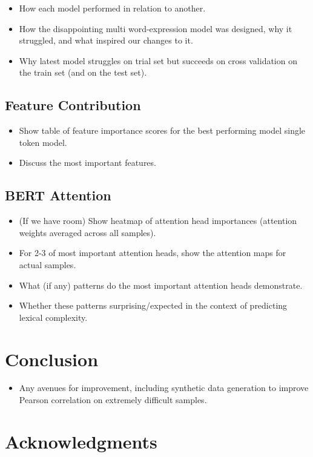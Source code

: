 \documentclass[11pt,a4paper]{article}
\begin{document}
\begin{itemize}
  \item How each model performed in relation to another.
  \item How the disappointing multi word-expression model was designed, why it struggled, and what inspired our changes to it.
  \item Why latest model struggles on trial set but succeeds on cross validation on the train set (and on the test set).
\end{itemize}

\subsection{Feature Contribution}

\begin{itemize}
  \item Show table of feature importance scores for the best performing model single token model.
  \item Discuss the most important features.
\end{itemize}

\subsection{BERT Attention}

\begin{itemize}
  \item (If we have room) Show heatmap of attention head importances (attention weights averaged across all samples).
  \item For 2-3 of most important attention heads, show the attention maps for actual samples.
  \item What (if any) patterns do the most important attention heads demonstrate.
  \item Whether these patterns surprising/expected in the context of predicting lexical complexity.
\end{itemize}

\section{Conclusion}
\begin{itemize}
  \item Any avenues for improvement, including synthetic data generation to improve Pearson correlation on extremely difficult samples.
\end{itemize}

\section*{Acknowledgments}




\end{document}
